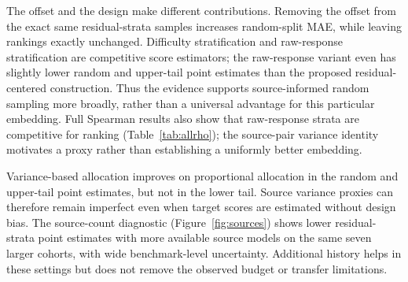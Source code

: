 The offset and the design make different contributions. Removing the offset from the exact same residual-strata samples increases random-split MAE, while leaving rankings exactly unchanged. Difficulty stratification and raw-response stratification are competitive score estimators; the raw-response variant even has slightly lower random and upper-tail point estimates than the proposed residual-centered construction. Thus the evidence supports source-informed random sampling more broadly, rather than a universal advantage for this particular embedding. Full Spearman results also show that raw-response strata are competitive for ranking (Table~\ref{tab:allrho}); the source-pair variance identity motivates a proxy rather than establishing a uniformly better embedding.

Variance-based allocation improves on proportional allocation in the random and upper-tail point estimates, but not in the lower tail. Source variance proxies can therefore remain imperfect even when target scores are estimated without design bias. The source-count diagnostic (Figure~\ref{fig:sources}) shows lower residual-strata point estimates with more available source models on the same seven larger cohorts, with wide benchmark-level uncertainty. Additional history helps in these settings but does not remove the observed budget or transfer limitations.
